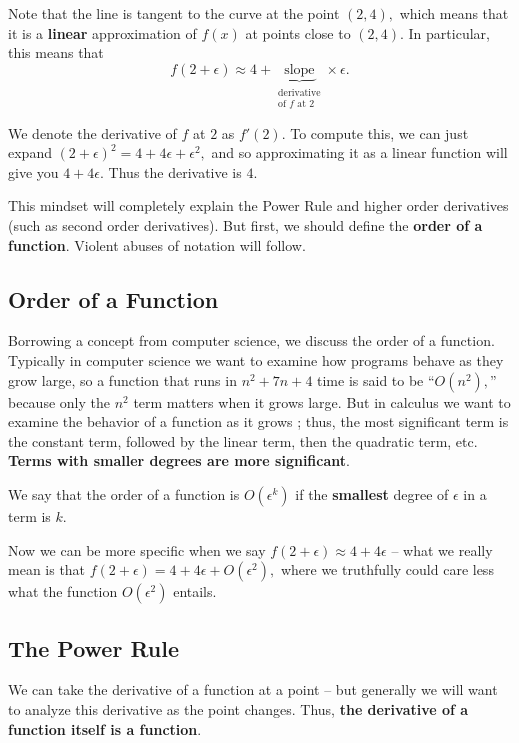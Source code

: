 \documentclass{article}
\begin{document}
\begin{sol}
Note that the line is tangent to the curve at the point $(2,4),$ which means that it is a \textbf{linear} approximation of $f(x)$ at points close to $(2,4).$ In particular, this means that
\[f(2+\epsilon)\approx 4+\underbrace{\text{slope}}_{\substack{\text{derivative} \\ \text{of } f \text{ at }2}}\times \epsilon.\]

We denote the derivative of $f$ at $2$ as $f'(2).$ To compute this, we can just expand $(2+\epsilon)^2=4+4\epsilon+\epsilon^2,$ and so approximating it as a linear function will give you $4+4\epsilon.$ Thus the derivative is $4.$
\end{sol}

This mindset will completely explain the Power Rule and higher order derivatives (such as second order derivatives).  But first, we should define the \textbf{order of a function}. Violent abuses of notation will follow.

\subsection{Order of a Function}
Borrowing a concept from computer science, we discuss the order of a function. Typically in computer science we want to examine how programs behave as they grow large, so a function that runs in $n^2+7n+4$ time is said to be ``$O(n^2),$'' because only the $n^2$ term matters when it grows large. But in calculus we want to examine the behavior of a function as it grows ; thus, the most significant term is the constant term, followed by the linear term, then the quadratic term, etc. \textbf{Terms with smaller degrees are more significant}.

\begin{defi}[Order]
We say that the order of a function is $O(\epsilon^k)$ if the \textbf{smallest} degree of $\epsilon$ in a term is $k.$
\end{defi}

Now we can be more specific when we say $f(2+\epsilon)\approx 4+4\epsilon$ -- what we really mean is that $f(2+\epsilon)=4+4\epsilon+O(\epsilon^2),$ where we truthfully could care less what the function $O(\epsilon^2)$ entails.

\subsection{The Power Rule}

We can take the derivative of a function at a point -- but generally we will want to analyze this derivative as the point changes. Thus, \textbf{the derivative of a function itself is a function}.
\end{document}
